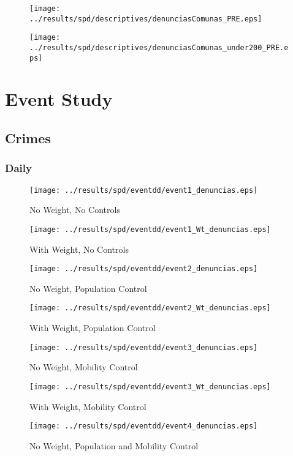 \documentclass[11pt,letterpaper]{article}
\begin{document}
\begin{figure}[H]
\caption{}
\centering
\texttt{[image: ../results/spd/descriptives/denunciasComunas\_PRE.eps]}
\end{figure}

\begin{figure}[H]
\caption{}
\centering
\texttt{[image: ../results/spd/descriptives/denunciasComunas\_under200\_PRE.eps]}
\end{figure}

\section{Event Study}
	\subsection{Crimes}
		\subsubsection{Daily}
\begin{figure}[H]
\caption{No Weight, No Controls}
\centering
\texttt{[image: ../results/spd/eventdd/event1\_denuncias.eps]}
\end{figure}

\begin{figure}[H]
\caption{With Weight, No Controls}
\centering
\texttt{[image: ../results/spd/eventdd/event1\_Wt\_denuncias.eps]}
\end{figure}
\begin{figure}[H]
\caption{No Weight, Population Control}
\centering
\texttt{[image: ../results/spd/eventdd/event2\_denuncias.eps]}
\end{figure}

\begin{figure}[H]
\caption{With Weight, Population Control}
\centering
\texttt{[image: ../results/spd/eventdd/event2\_Wt\_denuncias.eps]}
\end{figure}
\begin{figure}[H]
\caption{No Weight, Mobility Control}
\centering
\texttt{[image: ../results/spd/eventdd/event3\_denuncias.eps]}
\end{figure}

\begin{figure}[H]
\caption{With Weight, Mobility Control}
\centering
\texttt{[image: ../results/spd/eventdd/event3\_Wt\_denuncias.eps]}
\end{figure}
\begin{figure}[H]
\caption{No Weight, Population and Mobility Control}
\centering
\texttt{[image: ../results/spd/eventdd/event4\_denuncias.eps]}
\end{figure}
\end{document}
